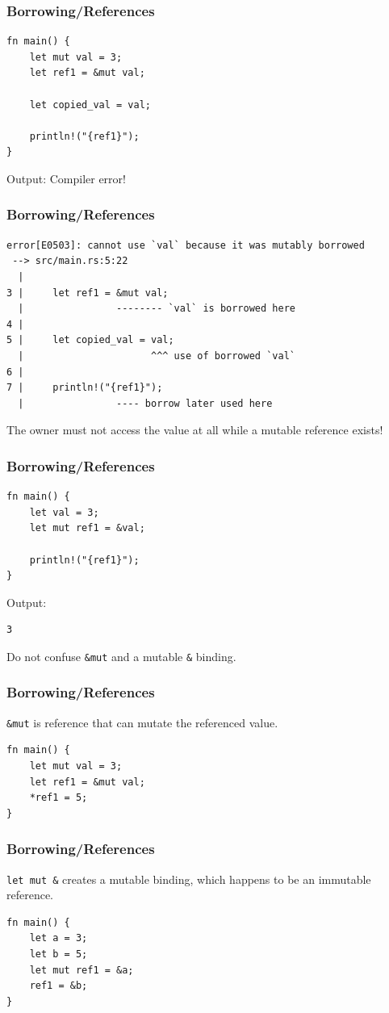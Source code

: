 \begin{frame}[fragile]
    \frametitle{Borrowing/References}
    \begin{verbatim}
fn main() {
    let mut val = 3;
    let ref1 = &mut val;

    let copied_val = val;

    println!("{ref1}");
}
    \end{verbatim}
    \vfill
    Output:
    \pause
    \vfill
    Compiler error!
\end{frame}

\begin{frame}[fragile]
    \frametitle{Borrowing/References}
    \begin{verbatim}
error[E0503]: cannot use `val` because it was mutably borrowed
 --> src/main.rs:5:22
  |
3 |     let ref1 = &mut val;
  |                -------- `val` is borrowed here
4 |
5 |     let copied_val = val;
  |                      ^^^ use of borrowed `val`
6 |
7 |     println!("{ref1}");
  |                ---- borrow later used here
    \end{verbatim}
    \pause
    \vfill
    The owner must not access the value at all while a mutable reference exists!
\end{frame}

\begin{frame}[fragile]
    \frametitle{Borrowing/References}
    \begin{verbatim}
fn main() {
    let val = 3;
    let mut ref1 = &val;

    println!("{ref1}");
}
    \end{verbatim}
    \vfill
    Output:
    \pause
    \vfill
    \begin{verbatim}
3
    \end{verbatim}
    \pause
    \vfill
    Do not confuse \texttt{\&mut} and a mutable \texttt{\&} binding.
\end{frame}

\begin{frame}[fragile]
    \frametitle{Borrowing/References}
    \texttt{\&mut} is reference that can mutate the referenced value.
    \pause
    \vfill
    \begin{verbatim}
fn main() {
    let mut val = 3;
    let ref1 = &mut val;
    *ref1 = 5;
}
    \end{verbatim}
\end{frame}

\begin{frame}[fragile]
    \frametitle{Borrowing/References}
    \texttt{let mut \&} creates a mutable binding, which happens to be an immutable reference.
    \pause
    \vfill
    \begin{verbatim}
fn main() {
    let a = 3;
    let b = 5;
    let mut ref1 = &a;
    ref1 = &b;
}
    \end{verbatim}
\end{frame}


